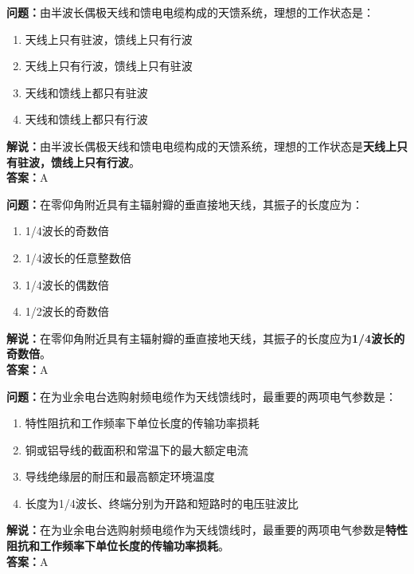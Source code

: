 \textbf{问题：}由半波长偶极天线和馈电电缆构成的天馈系统，理想的工作状态是：

\begin{enumerate}[label=\Alph*), leftmargin=1cm]
	\item 天线上只有驻波，馈线上只有行波
	\item 天线上只有行波，馈线上只有驻波
	\item 天线和馈线上都只有驻波
	\item 天线和馈线上都只有行波
\end{enumerate}

\textbf{解说：}由半波长偶极天线和馈电电缆构成的天馈系统，理想的工作状态是\textbf{天线上只有驻波，馈线上只有行波}。\\\textbf{答案：}A%



\textbf{问题：}在零仰角附近具有主辐射瓣的垂直接地天线，其振子的长度应为：

\begin{enumerate}[label=\Alph*), leftmargin=1cm]
	\item 1/4波长的奇数倍
	\item 1/4波长的任意整数倍
	\item 1/4波长的偶数倍
	\item 1/2波长的奇数倍
\end{enumerate}

\textbf{解说：}在零仰角附近具有主辐射瓣的垂直接地天线，其振子的长度应为\textbf{1/4波长的奇数倍}。\\\textbf{答案：}A%



\textbf{问题：}在为业余电台选购射频电缆作为天线馈线时，最重要的两项电气参数是：

\begin{enumerate}[label=\Alph*), leftmargin=1cm]
	\item 特性阻抗和工作频率下单位长度的传输功率损耗
	\item 铜或铝导线的截面积和常温下的最大额定电流
	\item 导线绝缘层的耐压和最高额定环境温度
	\item 长度为1/4波长、终端分别为开路和短路时的电压驻波比
\end{enumerate}

\textbf{解说：}在为业余电台选购射频电缆作为天线馈线时，最重要的两项电气参数是\textbf{特性阻抗和工作频率下单位长度的传输功率损耗}。\\\textbf{答案：}A%



